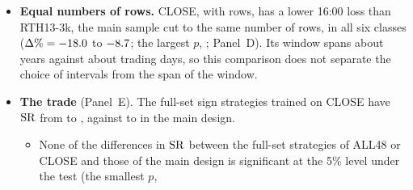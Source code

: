 \begin{itemize}
  lower 16:00 loss in all \rhtaWsNCells{} window and class pairs ($\Delta\% = \rhtaWsLinPctMin$ to
  $\rhtaWsLinPctMax$ for the penalized linear models, $\rhtaWsTreePctMin$ to $\rhtaWsTreePctMax$ for the tree
  ensembles), significantly at the 5\% level in \rhtaWsNSig{} of them and in every class from \rhtaWsSigFrom{}
  closes on.
\item \textbf{Equal numbers of rows.} CLOSE, with \rhtaRowsCl{} rows, has a lower 16:00 loss than RTH13-3k, the
  main sample cut to the same number of rows, in all six classes ($\Delta\% = -18.0$ to
  $-8.7$; the largest $p$, \rhtaClVsRthThreeKClosePMax; Panel~D). Its window spans about
  \rhtaSpanClSmall{} years against about \rhtaSpanRthSmall{} trading days, so this comparison does not separate the
  choice of intervals from the span of the window.
\item \textbf{The trade} (Panel~E). The full-set sign strategies trained on CLOSE have $\mathrm{SR}$ from
  \rhtaShFullClMin{} to \rhtaShFullClMax, against \rhtaShFullRthMin{} to \rhtaShFullRthMax{} in the main design.
  \begin{itemize}
  \item None of the \rhtaNDShTests{} differences in $\mathrm{SR}$ between the full-set strategies of ALL48 or CLOSE and those
    of the main design is significant at the 5\% level under the \citet{LedoitWolf2008} test (the smallest $p$,

\end{itemize}
\end{itemize}
